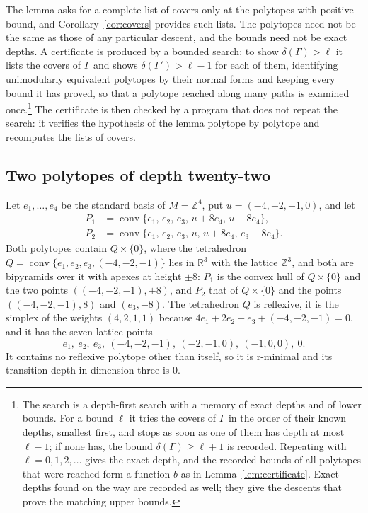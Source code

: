 \documentclass[manuscript]{aomart}
\theoremstyle{definition}
\theoremstyle{remark}
\newcommand{\conv}{\operatorname{conv}}
\begin{document}
The lemma asks for a complete list of covers only at the polytopes with
positive bound, and Corollary~\ref{cor:covers} provides such lists. The
polytopes need not be the same as those of any particular descent, and the
bounds need not be exact depths. A certificate is produced by a bounded
search: to show $\delta(\Gamma)>\ell$ it lists the covers of $\Gamma$ and
shows $\delta(\Gamma')>\ell-1$ for each of them, identifying unimodularly
equivalent polytopes by their normal forms and keeping every bound it has
proved, so that a polytope reached along many paths is examined
once.\footnote{The search is a depth-first search with a memory of exact
depths and of lower bounds. For a bound $\ell$ it tries the covers of
$\Gamma$ in the order of their known depths, smallest first, and stops as
soon as one of them has depth at most $\ell-1$; if none has, the bound
$\delta(\Gamma)\ge\ell+1$ is recorded. Repeating with $\ell=0,1,2,\dots$
gives the exact depth, and the recorded bounds of all polytopes that were
reached form a function $b$ as in Lemma~\ref{lem:certificate}. Exact depths
found on the way are recorded as well; they give the descents that prove the
matching upper bounds.} The certificate is then checked by a program that
does not repeat the search: it verifies the hypothesis of the lemma
polytope by polytope and recomputes the lists of covers.

\subsection{Two polytopes of depth twenty-two}\label{ssec:depth22}
\enlargethispage{4pt}

Let $e_1,\dots,e_4$ be the standard basis of $M=\mathbb{Z}^4$, put
$u=(-4,-2,-1,0)$, and let
\begin{align*}
P_1&=\conv\{e_1,\,e_2,\,e_3,\,u+8e_4,\,u-8e_4\},\\
P_2&=\conv\{e_1,\,e_2,\,e_3,\,u,\,u+8e_4,\,e_3-8e_4\}.
\end{align*}
Both polytopes contain $Q\times\{0\}$, where the tetrahedron
$Q=\conv\{e_1,e_2,e_3,(-4,-2,-1)\}$ lies in $\mathbb{R}^3$ with the
lattice $\mathbb{Z}^3$, and both are bipyramids over it with apexes
at height $\pm8$: $P_1$ is the convex hull of $Q\times\{0\}$ and the two
points $((-4,-2,-1),\pm8)$, and $P_2$ that of $Q\times\{0\}$ and the points
$((-4,-2,-1),8)$ and $(e_3,-8)$. The tetrahedron $Q$ is reflexive, it is the
simplex of the weights $(4,2,1,1)$ because $4e_1+2e_2+e_3+(-4,-2,-1)=0$, and
it has the seven lattice points
\[
e_1,\ e_2,\ e_3,\ (-4,-2,-1),\ (-2,-1,0),\ (-1,0,0),\ 0.
\]
It contains no reflexive polytope other than itself, so it is r-minimal
and its transition depth in dimension three is $0$.
\end{document}

